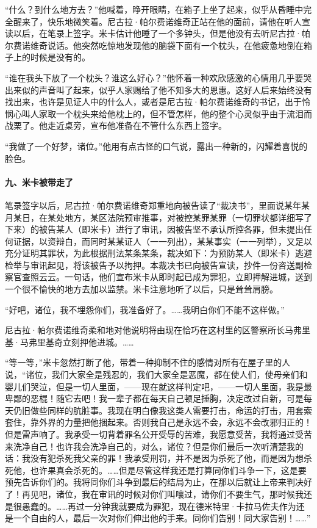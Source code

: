 \par “什么？到什么地方去？”他喊着，睁开眼睛，在箱子上坐了起来，似乎从昏睡中完全醒来了，快乐地微笑着。尼古拉·帕尔费诺维奇正站在他的面前，请他在听人宣读以后，在笔录上签字。米卡估计他睡了一个多钟头，但是他没有去听尼古拉·帕尔费诺维奇说话。他突然吃惊地发现他的脑袋下面有一个枕头，在他疲惫地倒在箱子上的时候是没有的。
\par “谁在我头下放了一个枕头？谁这么好心？”他怀着一种欢欣感激的心情用几乎要哭出来似的声音叫了起来，似乎人家赐给了他不知多大的恩惠。这好人后来始终没有找出来，也许是见证人中的什么人，或者是尼古拉·帕尔费诺维奇的书记，出于怜悯心叫人家取一个枕头来给他枕上的，但不管怎样，他的整个心灵似乎由于流泪而战栗了。他走近桌旁，宣布他准备在不管什么东西上签字。
\par “我做了一个好梦，诸位。”他用有点古怪的口气说，露出一种新的，闪耀着喜悦的脸色。
\paragraph*{九、米卡被带走了}
\par 笔录签字以后，尼古拉·帕尔费诺维奇郑重地向被告读了“裁决书”，里面说某年某月某日，在某处地方，某区法院预审推事，对被控某罪某罪（一切罪状都详细写了下来）的被告某人（即米卡）进行了审讯，因被告坚不承认所控各罪，但未提出任何证据，以资辩白，而同时某某证人（一一列出），某某事实（一一列举），又足以充分证明其罪状，为此根据刑法某条某条，裁决如下：为预防某人（即米卡）逃避检举与审讯起见，将该被告予以拘押。本裁决书已向被告宣读，抄件一份咨送副检察官查照云云。一句话，他们宣布米卡从即时起已成为罪犯，立即押解进城，送到一个很不愉快的地方去加以监禁。米卡注意地听了以后，只是耸耸肩膀。
\par “好吧，诸位，我不埋怨你们，我准备好了。……我明白你们不能不这样做。”
\par 尼古拉·帕尔费诺维奇柔和地对他说明将由现在恰巧在这村里的区警察所长马弗里基·马弗里基奇立刻押他进城。……
\par “等一等，”米卡忽然打断了他，带着一种抑制不住的感情对所有在屋子里的人说，“诸位，我们大家全是残忍的，我们大家全是恶魔，都在使人们，使母亲们和婴儿们哭泣，但是一切人里面，——现在就这样判定吧，——一切人里面，我是最卑鄙的恶棍！随它去吧！我一辈子都在每天自己顿足捶胸，决定改过自新，可是每天仍旧做些同样的肮脏事。我现在明白像我这类人需要打击，命运的打击，用套索套住，靠外界的力量把他捆起来。否则我自己是永远不会，永远不会改邪归正的！但是雷声响了。我承受一切背着罪名公开受辱的苦难，我愿意受苦，我将通过受苦来洗净自己！也许我会洗净自己的，对么，诸位？但是你们最后一次听清楚我的话：我没有犯杀死我父亲的罪！我承受刑罚，并不是因为杀死了他，而是因为想杀死他，也许果真会杀死的。……但是尽管这样我还是打算同你们斗争一下，这是要预先告诉你们的。我将同你们斗争到最后的结局为止，在那以后就让上帝来判决好了！再见吧，诸位，我在审讯的时候对你们叫嚷过，请你们不要生气，那时候我还是很愚蠢的。……再过一分钟我就要成为罪犯，现在德米特里·卡拉马佐夫作为还是一个自由的人，最后一次对你们伸出他的手来。同你们告别！同大家告别！……”
